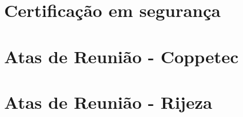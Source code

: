 \documentclass[a4paper,10pt,oneside,brazilian,
draft=false]{report}%
\newcommand*{\standardchapterstyle}{%
  \titleformat{\chapter}[display]
  {\normalfont\huge\bfseries}{\chaptertitlename\ \thechapter}{20pt}{\Huge}
  \titlespacing*{\chapter}{0pt}{50pt}{40pt}
}
\begin{document}
\chapter{Certificação em segurança}


\chapter{Atas de Reunião - Coppetec}


\chapter{Atas de Reunião - Rijeza}






 
 
%
%
%
%
%
%





%

\standardchapterstyle   
\end{document}
